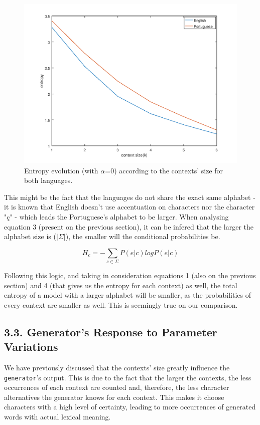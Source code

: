 \documentclass[12pt]{article}
\begin{document}
\begin{figure}[H]
  \includegraphics[width=6.3in]{ENvsPT.png}
  \caption{Entropy evolution (with $\alpha$=0) according to the contexts' size for both languages.}
  \label{graph3}
\end{figure}

This might be the fact that the languages do not share the exact same alphabet 
- it is known that English doesn't use accentuation on characters nor the 
character "ç" - which leads the Portuguese's alphabet to be larger.
When analysing equation 3 (present on the previous section), it can be infered 
that the larger the alphabet size is ($|\Sigma|$), the smaller will the 
conditional probabilities be.

\begin{equation}
  H_{c} = -\sum\limits_{c\in\Sigma} P(e|c) log P(e|c)
\end{equation}

Following this logic, and taking in consideration equations 1 (also on the 
previous section) and 4 (that gives us the entropy for each context) as well, 
the total entropy of a model with a larger alphabet will be smaller, as the 
probabilities of every context are smaller as well.
This is seemingly true on our comparison. 

\subsection*{3.3. Generator's Response to Parameter Variations}

We have previously discussed that the contexts' size greatly influence the
\texttt{generator}'s output.
This is due to the fact that the larger the contexts, the less occurrences
of each context are counted and, therefore, the less character alternatives
the generator knows for each context.
This makes it choose characters with a high level of certainty, leading to
more occurrences of generated words with actual lexical meaning.
\end{document}
